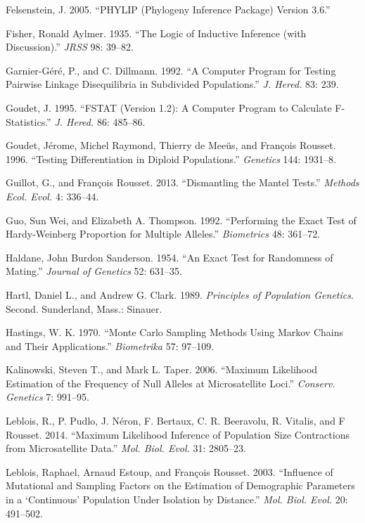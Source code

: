 \documentclass[12pt,]{book}
\begin{document}
\hypertarget{ref-Phylip}{}
Felsenstein, J. 2005. ``PHYLIP (Phylogeny Inference Package) Version
3.6.''

\hypertarget{ref-Fisher35}{}
Fisher, Ronald Aylmer. 1935. ``The Logic of Inductive Inference (with
Discussion).'' \emph{JRSS} 98: 39--82.

\hypertarget{ref-GarnierD92}{}
Garnier-Géré, P., and C. Dillmann. 1992. ``A Computer Program for
Testing Pairwise Linkage Disequilibria in Subdivided Populations.''
\emph{J. Hered.} 83: 239.

\hypertarget{ref-Goudet95}{}
Goudet, J. 1995. ``FSTAT (Version 1.2): A Computer Program to Calculate
F-Statistics.'' \emph{J. Hered.} 86: 485--86.

\hypertarget{ref-GoudetRMR96}{}
Goudet, Jérome, Michel Raymond, Thierry de Meeüs, and François Rousset.
1996. ``Testing Differentiation in Diploid Populations.''
\emph{Genetics} 144: 1931--8.

\hypertarget{ref-GuillotR13}{}
Guillot, G., and François Rousset. 2013. ``Dismantling the Mantel
Tests.'' \emph{Methods Ecol. Evol.} 4: 336--44.

\hypertarget{ref-GuoT92}{}
Guo, Sun Wei, and Elizabeth A. Thompson. 1992. ``Performing the Exact
Test of Hardy-Weinberg Proportion for Multiple Alleles.''
\emph{Biometrics} 48: 361--72.

\hypertarget{ref-Haldane54}{}
Haldane, John Burdon Sanderson. 1954. ``An Exact Test for Randomness of
Mating.'' \emph{Journal of Genetics} 52: 631--35.

\hypertarget{ref-HartlC2e}{}
Hartl, Daniel L., and Andrew G. Clark. 1989. \emph{Principles of
Population Genetics}. Second. Sunderland, Mass.: Sinauer.

\hypertarget{ref-Hastings70}{}
Hastings, W. K. 1970. ``Monte Carlo Sampling Methods Using Markov Chains
and Their Applications.'' \emph{Biometrika} 57: 97--109.

\hypertarget{ref-KalinowskiT06}{}
Kalinowski, Steven T., and Mark L. Taper. 2006. ``Maximum Likelihood
Estimation of the Frequency of Null Alleles at Microsatellite Loci.''
\emph{Conserv. Genetics} 7: 991--95.

\hypertarget{ref-LebloisX14}{}
Leblois, R., P. Pudlo, J. Néron, F. Bertaux, C. R. Beeravolu, R.
Vitalis, and F Rousset. 2014. ``Maximum Likelihood Inference of
Population Size Contractions from Microsatellite Data.'' \emph{Mol.
Biol. Evol.} 31: 2805--23.

\hypertarget{ref-LebloisER03}{}
Leblois, Raphael, Arnaud Estoup, and François Rousset. 2003. ``Influence
of Mutational and Sampling Factors on the Estimation of Demographic
Parameters in a `Continuous' Population Under Isolation by Distance.''
\emph{Mol. Biol. Evol.} 20: 491--502.
\end{document}
